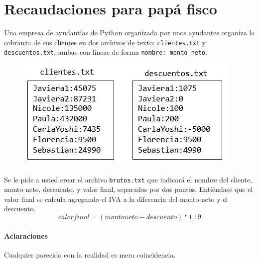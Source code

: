 \section{Recaudaciones para papá fisco}
Una empresa de ayudantías de Python organizada por unos ayudantes organiza la cobranza de sus clientes en dos archivos de texto: \texttt{clientes.txt} y \texttt{descuentos.txt}, ambas con líneas de forma \texttt{nombre: monto\_neto}.

\begin{figure}[h]
    \includegraphics{Guia/imagen2.jpg}
\end{figure}

Se le pide a usted crear el archivo \texttt{brutos.txt} que indicará el nombre del cliente, monto neto, descuento, y valor final, separados por dos puntos. Entiéndase que el valor final se calcula agregando el IVA a la diferencia del monto neto y el descuento.
\begin{displaymath}
valor final = (monto neto - descuento) * 1.19
\end{displaymath}

\paragraph{Aclaraciones} Cualquier parecido con la realidad es mera coincidencia.